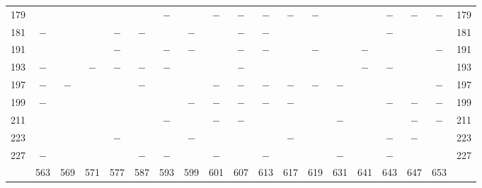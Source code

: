 \begin{center}
\begin{tabular}{r|c|c|c|c|c|c|c|c|c|c|c|c|c|c|c|c|c|r}
179 &  &  &  &  &  & $-$ &  & $-$ & $-$ & $-$ & $-$ & $-$ &  &  & $-$ & $-$ & $-$ & 179\\
181 & $-$ &  &  & $-$ & $-$ &  & $-$ &  & $-$ & $-$ &  &  &  &  & $-$ &  &  & 181\\
191 &  &  &  & $-$ &  & $-$ & $-$ &  & $-$ & $-$ &  & $-$ &  & $-$ &  &  & $-$ & 191\\
193 & $-$ &  & $-$ & $-$ & $-$ & $-$ &  &  & $-$ &  &  &  &  & $-$ & $-$ &  &  & 193\\
197 & $-$ & $-$ &  &  & $-$ &  &  & $-$ & $-$ & $-$ & $-$ & $-$ & $-$ &  &  &  & $-$ & 197\\
199 & $-$ &  &  &  &  &  & $-$ & $-$ & $-$ & $-$ & $-$ &  &  &  & $-$ & $-$ & $-$ & 199\\
211 &  &  &  &  &  & $-$ &  & $-$ & $-$ &  &  &  & $-$ &  &  & $-$ & $-$ & 211\\
223 &  &  &  & $-$ &  &  & $-$ &  &  &  & $-$ &  &  &  & $-$ & $-$ &  & 223\\
227 & $-$ &  &  &  & $-$ & $-$ &  & $-$ &  & $-$ &  &  & $-$ &  & $-$ &  &  & 227\\
\hline
 & 563 & 569 & 571 & 577 & 587 & 593 & 599 & 601 & 607 & 613 & 617 & 619 & 631 & 641 & 643 & 647 & 653 & \\
\hline
\end{tabular}\endgroup\end{center}
\clearpage
